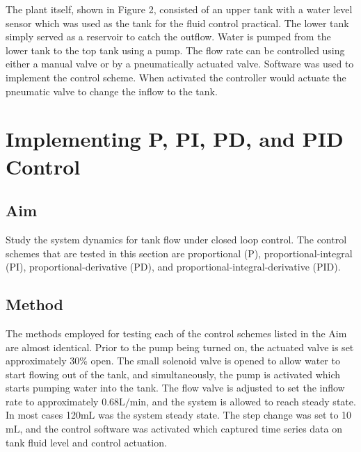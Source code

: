 \documentclass{article}
\begin{document}
The plant itself, shown in Figure 2, consisted of an upper tank with a water level sensor which was used as the tank for the fluid control practical. The lower tank simply served as a reservoir to catch the outflow. Water is pumped from the lower tank to the top tank using a pump. The flow rate can be controlled using either a manual valve or by a pneumatically actuated valve. Software was used to implement the control scheme. When activated the controller would actuate the pneumatic valve to change the inflow to the tank.


\section{Implementing P, PI, PD, and PID Control}

\subsection{Aim}
Study the system dynamics for tank flow under closed loop control. The control schemes that are tested in this section are proportional (P), proportional-integral (PI), proportional-derivative (PD), and proportional-integral-derivative (PID).

\subsection{Method}
The methods employed for testing each of the control schemes listed in the Aim are almost identical. Prior to the pump being turned on, the actuated valve is set approximately 30\% open. The small solenoid valve is opened to allow water to start flowing out of the tank, and simultaneously, the pump is activated which starts pumping water into the tank. The flow valve is adjusted to set the inflow rate to approximately 0.68$\si{\liter\per\minute}$, and the system is allowed to reach steady state. In most cases 120$\si{\milli\liter}$ was the system steady state. The step change was set to 10$\si{\milli\liter}$, and the control software was activated which captured time series data on tank fluid level and control actuation.

\end{document}
